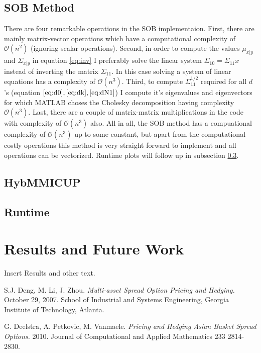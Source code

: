 \documentclass[a4paper]{article}
\begin{document}
\subsection{SOB Method}
There are four remarkable operations in the SOB implementaion. First, there are mainly matrix-vector operations which have a computational complexity of $\mathcal{O}(n^2)$ (ignoring scalar operations). Second, in order to compute the values $\mu_{x|y}$ and $\Sigma_{x|y}$ in equation \ref{eq:inv} I preferably solve the linear system $\Sigma_{10} = \Sigma_{11}x$ instead of inverting the matrix $\Sigma_{11}$. In this case solving a system of linear equations has a complexity of $\mathcal{O}(n^3)$. Third, to compute $\Sigma_{11}^{1/2}$ required for all $d$'s (equation $\ref{eq:d0}, \ref{eq:dk}, \ref{eq:dN1}$) I compute it's eigenvalues and eigenvectors for which MATLAB choses the Cholesky decomposition having complexity $\mathcal{O}(n^3)$. Last, there are a couple of matrix-matrix multiplications in the code with complexity of $\mathcal{O}(n^3)$ also. All in all, the SOB method has a compuational complexity of $\mathcal{O}(n^3)$ up to some constant, but apart from the computational costly operations this method is very straight forward to implement and all operations can be vectorized. Runtime plots will follow up in subsection \ref{rt}.
\subsection{HybMMICUP}
\subsection{Runtime}
\label{rt}

\newpage
\section{Results and Future Work}
\label{sec:results}
Insert Results and other text.

\newpage
\begin{thebibliography}{1}
S.J. Deng, M. Li, J. Zhou.
\textit{Multi-asset Spread Option Pricing and Hedging.}
October 29, 2007. School of Industrial and Systems Engineering, Georgia Institute of Technology, Atlanta.

G. Deelstra, A. Petkovic, M. Vanmaele.
\textit{Pricing and Hedging Asian Basket Spread Options.}
2010. Journal of Computational and Applied Mathematics 233 2814-2830.

\end{thebibliography}
\end{document}
